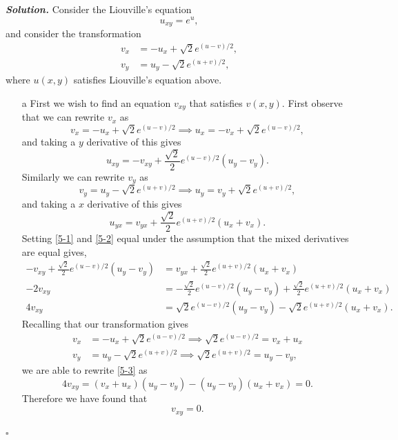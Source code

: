 \documentclass[12pt]{report}
\newenvironment{solution}[1][\it{Solution}]{\textbf{#1. } }{$\square$}
\begin{document}
\begin{solution}
    Consider the Liouville's equation
    \[
    u_{xy}=e^u,
    \]
    and consider the transformation
    \begin{align*}
        v_x&=-u_x+\sqrt{2}e^{(u-v)/2},\\
        v_y&=u_y-\sqrt{2}e^{(u+v)/2},
    \end{align*}
    where $u(x,y)$ satisfies Liouville's equation above.
    \noindent
    \begin{enumerate}
        \item [a]
        First we wish to find an equation $v_{xy}$ that satisfies $v(x,y)$. First observe that we can rewrite $v_x$ as
        \[
            v_x =-u_x+\sqrt{2}e^{(u-v)/2} \implies
            u_x = -v_x + \sqrt{2}e^{(u-v)/2},
        \]
        and taking a $y$ derivative of this gives
        \begin{equation} \label{5-1}
            u_{xy} = -v_{xy} + \frac{\sqrt{2}}{2}e^{(u-v)/2}(u_y - v_y).
        \end{equation}
        Similarly we can rewrite $v_y$ as
        \[ 
            v_y = u_y - \sqrt{2}e^{(u+v)/2} \implies
            u_y = v_y + \sqrt{2}e^{(u+v)/2},
        \]
        and taking a $x$ derivative of this gives
        \begin{equation} \label{5-2}
            u_{yx} = v_{yx} + \frac{\sqrt{2}}{2}e^{(u+v)/2}(u_x + v_x).
        \end{equation}
        Setting \ref{5-1} and \ref{5-2} equal under the assumption that the mixed derivatives are equal gives,
        \begin{align}
            -v_{xy} + \frac{\sqrt{2}}{2}e^{(u-v)/2}(u_y - v_y) &= v_{yx} + \frac{\sqrt{2}}{2}e^{(u+v)/2}(u_x + v_x) \nonumber \\
            -2v_{xy} &= -\frac{\sqrt{2}}{2}e^{(u-v)/2}(u_y - v_y) + \frac{\sqrt{2}}{2}e^{(u+v)/2}(u_x + v_x) \nonumber \\ 
            4v_{xy} &= \sqrt{2}e^{(u-v)/2}(u_y - v_y) - \sqrt{2}e^{(u+v)/2}(u_x + v_x) \label{5-3}.
        \end{align}
        Recalling that our transformation gives
        \begin{align*}
            v_x&=-u_x+\sqrt{2}e^{(u-v)/2} \implies \sqrt{2}e^{(u-v)/2} = v_x + u_x\\
            v_y&=u_y-\sqrt{2}e^{(u+v)/2} \implies \sqrt{2}e^{(u+v)/2} = u_y - v_y,
        \end{align*}
        we are able to rewrite \ref{5-3} as
        \[
            4v_{xy} = (v_x + u_x)(u_y - v_y) - (u_y - v_y)(u_x + v_x) = 0.
        \]
        Therefore we have found that
        \[v_{xy} = 0.\]



\end{enumerate}
\end{solution}
\end{document}
